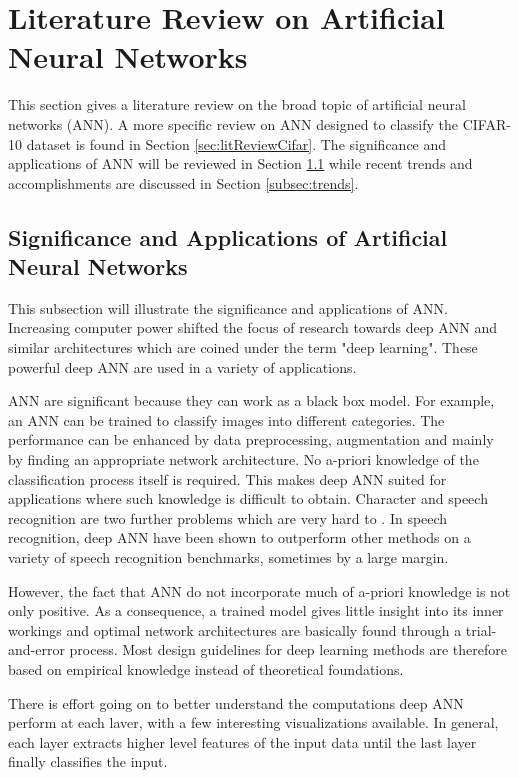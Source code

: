 \section{Literature Review on Artificial Neural Networks}
     \pagestyle{mario}
     
This section gives a literature review on the broad topic of artificial neural networks (ANN). A more specific review on ANN designed to classify the CIFAR-10 dataset is found in Section \ref{sec:litReviewCifar}. The significance and applications of ANN will be reviewed in Section \ref{subsec:signif} while recent trends and accomplishments are discussed in Section \ref{subsec:trends}.

\subsection{Significance and Applications of Artificial Neural Networks}\label{subsec:signif}

This subsection will illustrate the significance and applications of ANN. Increasing computer power shifted the focus of research towards deep ANN and similar architectures which are coined under the term "deep learning". These powerful  deep ANN are used in a variety of applications\cite{wang2015survey}\cite{lecun2015deep}.

ANN are significant because they can work as a black box model. For example, an ANN can be trained to classify images into different categories. The performance can be enhanced by data preprocessing, augmentation and mainly by finding an appropriate network architecture. No a-priori knowledge of the classification process itself is required. This makes deep ANN suited for applications where such knowledge is difficult to obtain. Character and speech recognition are two further problems which are very hard to . In speech recognition, deep ANN have been shown to outperform other methods on a variety of speech recognition benchmarks, sometimes by a large margin\cite{hinton2012deep}.

However, the fact that ANN do not incorporate much of a-priori knowledge is not only positive. As a consequence, a trained model gives little insight into its inner workings and optimal network architectures are basically found through a trial-and-error process. Most design guidelines for deep learning methods are therefore based on empirical knowledge instead of theoretical foundations.

There is effort going on to better understand the computations deep ANN perform at each laver, with a few interesting visualizations available\cite{mordvintsev2015}\cite{yosinski2015understanding}. In general, each layer extracts higher level features of the input data until the last layer finally classifies the input.

